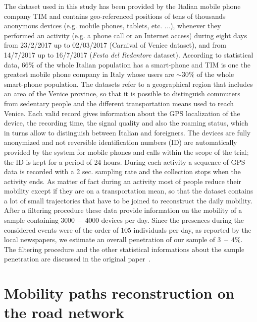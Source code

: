 \documentclass{standalone}
\begin{document}
The dataset used in this study has been provided by the Italian mobile phone company TIM and contains geo-referenced positions of tens of thousands anonymous devices (e.g. mobile phones, tablets, etc. ...), whenever they performed an activity (e.g. a phone call or an Internet access) during eight days from 23/2/2017 up to 02/03/2017 (Carnival of Venice dataset), and from 14/7/2017 up to 16/7/2017 (\emph{Festa del Redentore} dataset).
According to statistical data, 66\% of the whole Italian population has a smart-phone and TIM is one the greatest mobile phone company in Italy whose users are $\sim30\%$ of the whole smart-phone population.
The datasets refer to a geographical region that includes an area of the Venice province, so that it is possible to distinguish commuters from sedentary people and the different transportation means used to reach Venice.
Each valid record gives information about the GPS localization of the device, the recording time, the signal quality and also the roaming status, which in turns allow to distinguish between Italian and
foreigners.
The devices are fully anonymized and not reversible identification numbers (ID) are automatically provided by the system for mobile phones and calls within the scope of the trial; the ID is kept for a period of 24 hours.
During each activity a sequence of GPS data is recorded with a 2 sec. sampling rate and the collection stops when the activity ends.
As matter of fact during an activity most of people reduce their mobility except if they are on a transportation mean, so that the dataset contains a lot of small trajectories that have to be joined to reconstruct the daily mobility.
After a filtering procedure these data provide information on the mobility of a sample containing 3000~–~4000 devices per day.
Since the presences during the considered events were of the order of 105 individuals per day, as reported by the local newspapers, we estimate an overall penetration of our sample of 3~–~4\%.
The filtering procedure and the other statistical informations about the sample penetration are discussed in the original paper~\cite{Mizzi2018}.



\section*{Mobility paths reconstruction on the road network}
\end{document}
